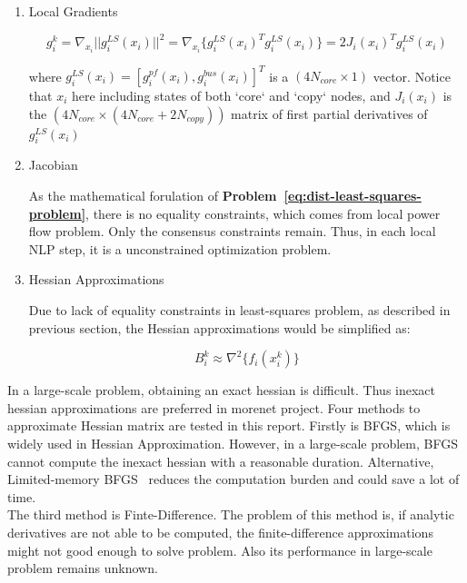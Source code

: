\documentclass{article}
\begin{document}
\begin{enumerate}
\item Local Gradients

    \begin{equation}
            g_i^k =\nabla_{x_i} ||g_i^{LS}(x_i)||^2 = \nabla_{x_i} \{g_i^{LS}(x_i)^T g_i^{LS}(x_i) \} = 2 J_i(x_i)^T g_i^{LS}(x_i)
    \end{equation}

where $g_i^{LS}(x_i) = [g_i^{pf}(x_i),g_i^{bus}(x_i)]^T$ is a $(4N_{core} \times 1 )$ vector. Notice that $x_i$ here including states of both `core` and `copy` nodes, and  $J_i(x_i)$ is the $(4N_{core} \times (4N_{core}+2N_{copy}))$ matrix of first partial derivatives of $g_i^{LS}(x_i)$

\item Jacobian

As the mathematical forulation of \textbf{Problem~\ref{eq:dist-least-squares-problem}}, there is no equality constraints, which comes from local power flow problem. Only the consensus constraints remain. Thus, in each local NLP step, it is a unconstrained optimization problem.

\item Hessian Approximations

Due to lack of equality constraints in least-squares problem, as described in previous section, the Hessian approximations would be simplified as:

    \begin{equation}
        B^k_i \approx \nabla^2 \{f_i(x_i^k)\}
    \end{equation}
    
\end{enumerate}

In a large-scale problem, obtaining an exact hessian is difficult. Thus inexact hessian approximations are preferred in morenet project. Four methods to approximate Hessian matrix are tested in this report. Firstly is BFGS, which is widely used in Hessian Approximation. However, in a large-scale problem, BFGS cannot compute the inexact hessian with a reasonable duration. Alternative, Limited-memory BFGS~\citep{Numerical_Optimization} reduces the computation burden and could save a lot of time. \\

The third method is Finte-Difference. The problem of this method is, if analytic derivatives are not able to be computed, the finite-difference approximations might not good enough to solve problem. Also its performance in large-scale problem remains unknown.\\
\end{document}
